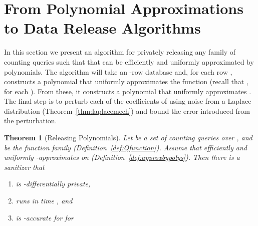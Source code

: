 \documentclass[11pt]{article}
\newtheorem{theorem}{Theorem}[section]
\theoremstyle{definition}
\begin{document}
\section{From Polynomial Approximations to Data Release Algorithms} \label{sec:release}
In this section we present an algorithm for privately releasing any family of counting queries  such that  that can be efficiently and uniformly approximated by polynomials.  The algorithm will take an -row database  and, for each row , constructs a polynomial  that uniformly approximates the function  (recall that , for each ).  From these, it constructs a polynomial  that uniformly approximates .  The final step is to perturb each of the coefficients of  using noise from a Laplace distribution (Theorem~\ref{thm:laplacemech}) and bound the error introduced from the perturbation.

\begin{theorem}[Releasing Polynomials] \label{thm:releasepolys}
Let  be a set of counting queries over , and  be the  function family (Definition~\ref{def:Qfunction}).  Assume that  efficiently and uniformly -approximates  on  (Definition~\ref{def:approxbypolys}).  Then there is a sanitizer  that
\begin{enumerate}
\item is -differentially private,
\item runs in time , and
\item is -accurate for  for

\end{enumerate}
\end{theorem}
\end{document}
